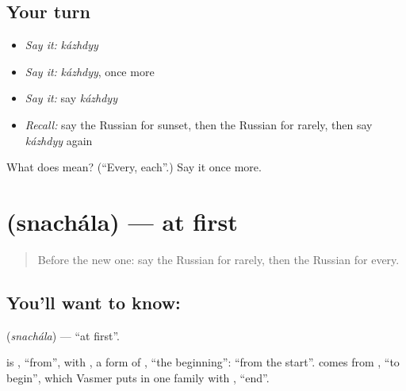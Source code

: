 \subsection*{Your turn}
\begin{itemize}
\raggedright
  \item \emph{Say it:} \emph{kázhdyy}
  \item \emph{Say it:} \emph{kázhdyy}, once more
  \item \emph{Say it:} say \emph{kázhdyy}
  \item \emph{Recall:} say the Russian for sunset, then the Russian for rarely, then say \emph{kázhdyy} again
\end{itemize}

\begin{tcolorbox}[breakable,colback=teal!4,colframe=teal!35!black,title={Before you move on}]
What does  mean? (\textquotedblleft{}Every, each\textquotedblright{}.) Say it once more.
\end{tcolorbox}
\section[\texorpdfstring{\ru{сначала} (snachála)}{сначала (snachála)}]{ (snachála) — at first}

\label{lesson:RU-C150-snachala}



\begin{quote}
Before the new one: say the Russian for rarely, then the Russian for every.
\end{quote}

\subsection*{You'll want to know: }
\textbf{} (\emph{snachála}) — \textquotedblleft{}at first\textquotedblright{}.

\begin{cousinweb}
\textbf{} is \emph{}, \textquotedblleft{}from\textquotedblright{}, with \emph{}, a form of \emph{}, \textquotedblleft{}the beginning\textquotedblright{}: \textquotedblleft{}from the start\textquotedblright{}. \emph{} comes from \emph{}, \textquotedblleft{}to begin\textquotedblright{}, which Vasmer puts in one family with \emph{}, \textquotedblleft{}end\textquotedblright{}.
\end{cousinweb}

